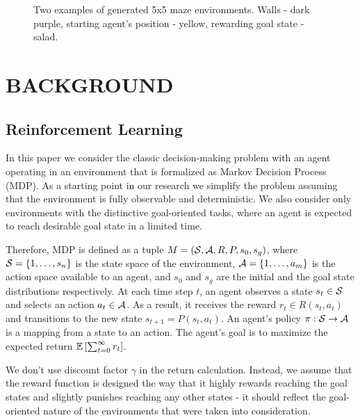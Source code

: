 \documentclass[a4paper,twoside]{article}
\begin{document}
\begin{figure}
  \centering
  \begin{minipage}{.49\linewidth}
    
  \end{minipage}
  \begin{minipage}{.49\linewidth}
    
  \end{minipage}
  \caption{Two examples of generated 5x5 maze environments. Walls - dark purple, starting agent's position - yellow, rewarding goal state - salad.} \label{fig_maze_examples}
\end{figure}

\section{\uppercase{Background}}

\subsection{Reinforcement Learning}

In this paper we consider the classic decision-making problem with an agent operating in an environment that is formalized as Markov Decision Process (MDP). As a starting point in our research we simplify the problem assuming that the environment is fully observable and deterministic. We also consider only environments with the distinctive goal-oriented tasks, where an agent is expected to reach desirable goal state in a limited time.

Therefore, MDP is defined as a tuple $M = (\mathcal{S}, \mathcal{A}, R, P, s_0, s_g)$, where $\mathcal{S} = \{1, \dots, s_n\}$ is the state space of the environment, $\mathcal{A} = \{1, \dots, a_m\}$ is the action space available to an agent, and $s_0$ and $s_g$ are the initial and the goal state distributions respectively. At each time step $t$, an agent observes a state $s_t \in \mathcal{S}$ and selects an action $a_t \in \mathcal{A}$. As a result, it receives the reward $r_t \in R(s_t, a_t)$ and transitions to the new state $s_{t+1} = P(s_t, a_t)$. An agent's policy $\pi: \mathcal{S} \rightarrow \mathcal{A}$ is a mapping from a state to an action. The agent's goal is to maximize the expected return $\mathbb{E} \left[ \sum_{t=0}^{\infty} r_t \right]$. 

We don't use discount factor $\gamma$ in the return calculation. Instead, we assume that the reward function is designed the way that it highly rewards reaching the goal states and slightly punishes reaching any other states - it should reflect the goal-oriented nature of the environments that were taken into consideration.
\end{document}
